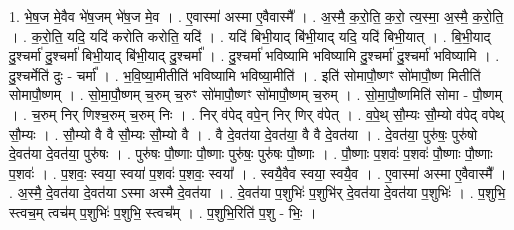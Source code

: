 \documentclass[17pt]{extarticle}
\begin{document}
1. भे॒ष॒ज मे॒वैव भे॑ष॒जम् भे॑ष॒ज मे॒व । . ए॒वास्मा॑ अस्मा ए॒वैवास्मै᳚ । . अ॒स्मै॒ क॒रो॒ति॒ क॒रो॒ त्य॒स्मा॒ अ॒स्मै॒ क॒रो॒ति॒ । . क॒रो॒ति॒ यदि॒ यदि॑ करोति करोति॒ यदि॑ । . यदि॑ बिभी॒याद् बि॑भी॒याद् यदि॒ यदि॑ बिभी॒यात् । . बि॒भी॒याद् दु॒श्चर्मा॑ दु॒श्चर्मा॑ बिभी॒याद् बि॑भी॒याद् दु॒श्चर्मा᳚ । . दु॒श्चर्मा॑ भविष्यामि भविष्यामि दु॒श्चर्मा॑ दु॒श्चर्मा॑ भविष्यामि । . दु॒श्चर्मेति॑ दुः - चर्मा᳚ । . भ॒वि॒ष्या॒मीतीति॑ भविष्यामि भविष्या॒मीति॑ । . इति॑ सोमापौ॒ष्णꣳ सो॑मापौ॒ष्ण मितीति॑ सोमापौ॒ष्णम् । . सो॒मा॒पौ॒ष्णम् च॒रुम् च॒रुꣳ सो॑मापौ॒ष्णꣳ सो॑मापौ॒ष्णम् च॒रुम् । . सो॒मा॒पौ॒ष्णमिति॑ सोमा - पौ॒ष्णम् । . च॒रुम् निर् णिश्च॒रुम् च॒रुम् निः । . निर् व॑पेद् वपे॒न् निर् णिर् व॑पेत् । . व॒पे॒थ् सौ॒म्यः सौ॒म्यो व॑पेद् वपेथ् सौ॒म्यः । . सौ॒म्यो वै वै सौ॒म्यः सौ॒म्यो वै । . वै दे॒वत॑या दे॒वत॑या॒ वै वै दे॒वत॑या । . दे॒वत॑या॒ पुरु॑षः॒ पुरु॑षो दे॒वत॑या दे॒वत॑या॒ पुरु॑षः । . पुरु॑षः पौ॒ष्णाः पौ॒ष्णाः पुरु॑षः॒ पुरु॑षः पौ॒ष्णाः । . पौ॒ष्णाः प॒शवः॑ प॒शवः॑ पौ॒ष्णाः पौ॒ष्णाः प॒शवः॑ । . प॒शवः॒ स्वया॒ स्वया॑ प॒शवः॑ प॒शवः॒ स्वया᳚ । . स्वयै॒वैव स्वया॒ स्वयै॒व । . ए॒वास्मा॑ अस्मा ए॒वैवास्मै᳚ । . अ॒स्मै॒ दे॒वत॑या दे॒वत॑या ऽस्मा अस्मै दे॒वत॑या । . दे॒वत॑या प॒शुभिः॑ प॒शुभि॑र् दे॒वत॑या दे॒वत॑या प॒शुभिः॑ । . प॒शुभि॒ स्त्वच॒म् त्वच॑म् प॒शुभिः॑ प॒शुभि॒ स्त्वच᳚म् । . प॒शुभि॒रिति॑ प॒शु - भिः॒ । \newline
\end{document}
